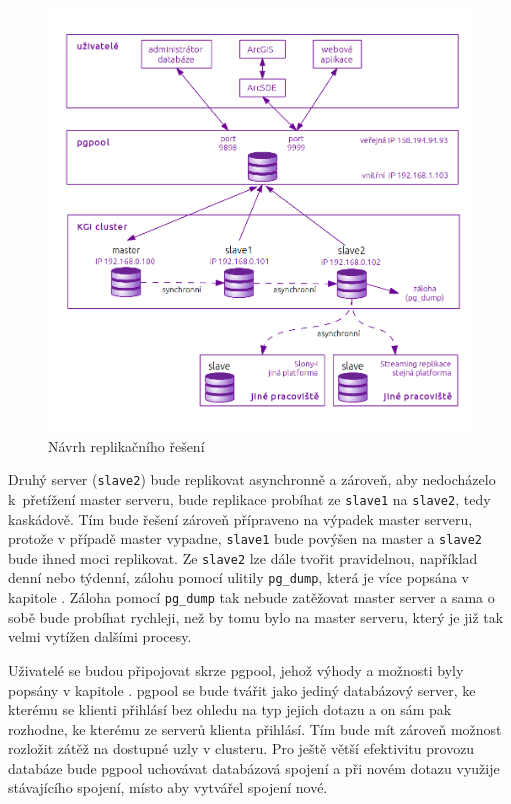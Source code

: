       \begin{figure}[H]
        \label{oNavrhKatedra}
        \centering
        \includegraphics[scale=1]{../../../grafy/obr/schema_navrhKatedra.png}
        \caption {Návrh replikačního řešení}
      \end{figure}

      Druhý server (\texttt{slave2}) bude replikovat asynchronně a zároveň, aby nedocházelo k~přetížení master serveru, bude replikace probíhat ze \texttt{slave1} na \texttt{slave2}, tedy kaskádově. Tím bude řešení zároveň přípraveno na výpadek master serveru, protože v případě master vypadne, \texttt{slave1} bude povýšen na master a \texttt{slave2} bude ihned moci replikovat. Ze \texttt{slave2} lze dále tvořit pravidelnou, například denní nebo týdenní, zálohu pomocí ulitily \texttt{pg\_dump}, která je více popsána v kapitole . Záloha pomocí \texttt{pg\_dump} tak nebude zatěžovat master server a sama o sobě bude probíhat rychleji, než by tomu bylo na master serveru, který je již tak velmi vytížen dalšími procesy.

Uživatelé se budou připojovat skrze pgpool, jehož výhody a možnosti byly popsány v kapitole . pgpool se bude tvářit jako jediný databázový server, ke kterému se klienti přihlásí bez ohledu na typ jejich dotazu a on sám pak rozhodne, ke kterému ze serverů klienta přihlásí. Tím bude mít zároveň možnost rozložit zátěž na dostupné uzly v clusteru. Pro ještě větší efektivitu provozu databáze bude pgpool uchovávat databázová spojení a při novém dotazu využije stávajícího spojení, místo aby vytvářel spojení nové. 

